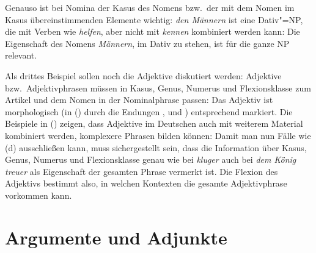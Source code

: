 Genauso ist bei Nomina der Kasus des Nomens bzw.\ der mit dem Nomen im Kasus übereinstimmenden
Elemente wichtig: \emph{den Männern} ist eine Dativ"=NP, die mit Verben wie \emph{helfen}, aber
nicht mit \emph{kennen} kombiniert werden kann:
\eal
{}
\zl
Die Eigenschaft des Nomens \emph{Männern}, im Dativ zu stehen, ist für die ganze NP relevant.

Als drittes Beispiel sollen noch die Adjektive diskutiert werden: Adjektive bzw.\ Adjektivphrasen
müssen in Kasus, Genus, Numerus und Flexionsklasse zum Artikel und dem Nomen in der Nominalphrase
passen:
\eal
{}
\zl
Das Adjektiv ist morphologisch (in () durch die Endungen ,  und
) entsprechend markiert. Die Beispiele in () zeigen, dass Adjektive im Deutschen
auch mit weiterem Material kombiniert werden, \dash komplexere Phrasen bilden können:
\eal
{}
\zl
Damit man nun Fälle wie (d) ausschließen kann, muss sichergestellt sein, dass die Information
über Kasus, Genus, Numerus und Flexionsklasse genau wie bei \emph{kluger} auch bei \emph{dem König
treuer} als Eigenschaft der gesamten Phrase vermerkt ist. Die Flexion des Adjektivs bestimmt also, in welchen Kontexten
die gesamte Adjektivphrase vorkommen kann.



\section{Argumente und Adjunkte}
\label{sec-intro-arg-adj}

